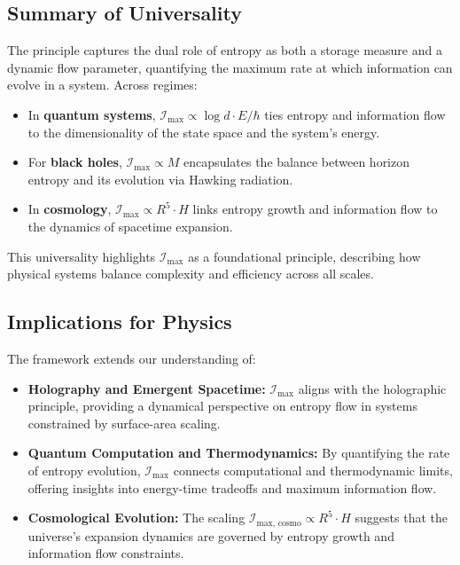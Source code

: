 \documentclass[12pt]{article}
\begin{document}
\subsection{Summary of Universality}
The principle captures the dual role of entropy as both a storage measure and a dynamic flow parameter, quantifying the maximum rate at which information can evolve in a system. Across regimes:
\begin{itemize}
    \item In \textbf{quantum systems}, \( \mathcal{I}_{\text{max}} \propto \log d \cdot E / \hbar \) ties entropy and information flow to the dimensionality of the state space and the system's energy.
    \item For \textbf{black holes}, \( \mathcal{I}_{\text{max}} \propto M \) encapsulates the balance between horizon entropy and its evolution via Hawking radiation.
    \item In \textbf{cosmology}, \( \mathcal{I}_{\text{max}} \propto R^5 \cdot H \) links entropy growth and information flow to the dynamics of spacetime expansion.
\end{itemize}

This universality highlights \( \mathcal{I}_{\text{max}} \) as a foundational principle, describing how physical systems balance complexity and efficiency across all scales.

\subsection{Implications for Physics}
The framework extends our understanding of:
\begin{itemize}
    \item \textbf{Holography and Emergent Spacetime:} \( \mathcal{I}_{\text{max}} \) aligns with the holographic principle, providing a dynamical perspective on entropy flow in systems constrained by surface-area scaling.
    \item \textbf{Quantum Computation and Thermodynamics:} By quantifying the rate of entropy evolution, \( \mathcal{I}_{\text{max}} \) connects computational and thermodynamic limits, offering insights into energy-time tradeoffs and maximum information flow.
    \item \textbf{Cosmological Evolution:} The scaling \( \mathcal{I}_{\text{max, cosmo}} \propto R^5 \cdot H \) suggests that the universe’s expansion dynamics are governed by entropy growth and information flow constraints.
\end{itemize}
\end{document}
